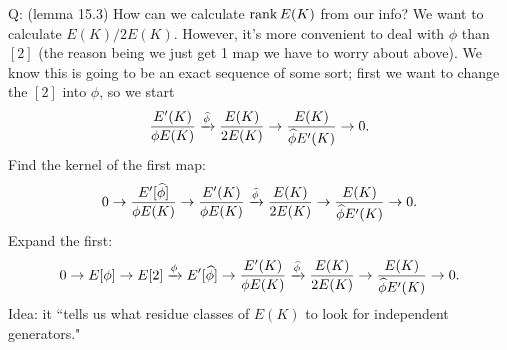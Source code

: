 Q: (lemma 15.3) How can we calculate $\operatorname{rank} E(K)$ from our info? We want to calculate $E(K)/2E(K)$. However, it's more convenient to deal with $\phi$ than $[2]$ (the reason being we just get 1 map we have to worry about above). We know this is going to be an exact sequence of some sort; first we want to change the $[2]$ into $\phi$, so we start
\[
\frac{E'(K)}{\phi E(K)}\xrightarrow{\widehat{\phi}} \frac{E(K)}{2E(K)}\to \frac{E(K)}{\widehat{\phi}E'(K)}\to 0.
\]
Find the kernel of the first map:
\[
0\to \frac{E'[\widehat{\phi}]}{\phi E(K)} \to \frac{E'(K)}{\phi E(K)}\xrightarrow{\widehat{\phi}} \frac{E(K)}{2E(K)}\to \frac{E(K)}{\widehat{\phi}E'(K)}\to 0.
\]
Expand the first:
\[
0\to E[\phi]\to E[2]\xrightarrow{\phi} {E'[\widehat{\phi}]} \to \frac{E'(K)}{\phi E(K)}\xrightarrow{\widehat{\phi}} \frac{E(K)}{2E(K)}\to \frac{E(K)}{\widehat{\phi}E'(K)}\to 0.
\]
Idea: it ``tells us what residue classes of $E(K)$ to look for independent generators."

